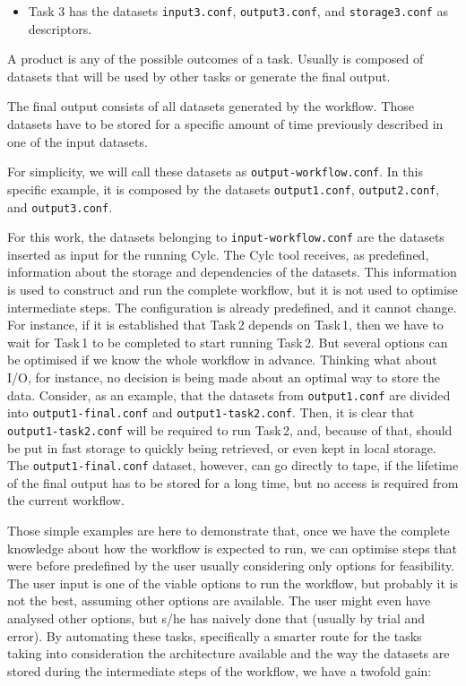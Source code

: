 \documentclass[a4paper]{article}
\begin{document}
{{{{\begin{description}
\begin{itemize}
\item Task 3 has the datasets \texttt{input3.conf}, \texttt{output3.conf}, and \texttt{storage3.conf} as descriptors.

\end{itemize}

\item[Product]

A product is any of the possible outcomes of a task. Usually is composed of datasets that will be used by other tasks or generate the final output.

\item[Final Output]

The final output consists of all datasets generated by the workflow. Those datasets have to be stored for a specific amount of time previously described in one of the input datasets.

For simplicity, we will call these datasets as \texttt{output-workflow.conf}. In this specific example, it is composed by the datasets \texttt{output1.conf}, \texttt{output2.conf}, and \texttt{output3.conf}.

\end{description}

For this work, the datasets belonging to \texttt{input-workflow.conf} are the datasets inserted as input for the running Cylc. The Cylc tool receives, as predefined, information about the storage and dependencies of the datasets. This information is used to construct and run the complete workflow, but it is not used to optimise intermediate steps. The configuration is already predefined, and it cannot change. For instance, if it is established that Task\,2 depends on Task\,1, then we have to wait for Task\,1 to be completed to start running Task\,2. But several options can be optimised if we know the whole workflow in advance. Thinking what about I/O, for instance, no decision is being made about an optimal way to store the data. Consider, as an example, that the datasets from \texttt{output1.conf} are divided into \texttt{output1-final.conf} and \texttt{output1-task2.conf}. Then, it is clear that \texttt{output1-task2.conf} will be required to run Task\,2, and, because of that, should be put in fast storage to quickly being retrieved, or even kept in local storage. The \texttt{output1-final.conf} dataset, however, can go directly to tape, if the lifetime of the final output has to be stored for a long time, but no access is required from the current workflow.

Those simple examples are here to demonstrate that, once we have the complete knowledge about how the workflow is expected to run, we can optimise steps that were before predefined by the user usually considering only options for feasibility. The user input is one of the viable options to run the workflow, but probably it is not the best, assuming other options are available. The user might even have analysed other options, but s/he has naively done that (usually by trial and error). By automating these tasks, specifically a smarter route for the tasks taking into consideration the architecture available and the way the datasets are stored during the intermediate steps of the workflow, we have a twofold gain:

}}}}
\end{document}
